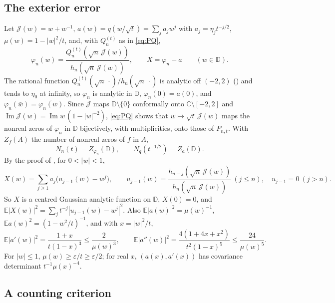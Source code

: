 \documentclass[11pt]{amsart}
\theoremstyle{definition}
\theoremstyle{remark}
\numberwithin{equation}{section}
\newcommand{\C}{\mathbb{C}}
\newcommand{\D}{\mathbb{D}}
\newcommand{\E}{\mathbb{E}}
\newcommand{\eps}{\varepsilon}
\DeclareMathOperator{\im}{Im}
\begin{document}
\subsection{The exterior error}\label{subsec:near1-X}
Let $\mathcal J(w)=w+w^{-1}$, $a(w)=q(w/\sqrt t)=\sum_ja_jw^j$ with $a_j=\eta_jt^{-j/2}$, $\mu(w)=1-|w|^2/t$, and, with $Q_n^{(t)}$ as in \eqref{eq:PQ},
\[
\varphi_n(w)=\frac{Q_n^{(t)}(\sqrt n\,\mathcal J(w))}{h_n(\sqrt n\,\mathcal J(w))},\qquad X=\varphi_n-a\qquad(w\in\D).
\]
The rational function $Q_n^{(t)}(\sqrt n\,\cdot)/h_n(\sqrt n\,\cdot)$ is analytic off $(-2,2)$ (\cite[Lemma~\ref{M-lem:resolvent}]{Main}) and tends to $\eta_0$ at infinity, so $\varphi_n$ is analytic in $\D$, $\varphi_n(0)=a(0)$, and $\varphi_n(\bar w)=\overline{\varphi_n(w)}$. Since $\mathcal J$ maps $\D\setminus\{0\}$ conformally onto $\C\setminus[-2,2]$ and $\im\mathcal J(w)=\im w\,(1-|w|^{-2})$, \eqref{eq:PQ} shows that $w\mapsto\sqrt t\,\mathcal J(w)$ maps the nonreal zeros of $\varphi_n$ in $\D$ bijectively, with multiplicities, onto those of $P_{n,t}$. With $Z_f(A)$ the number of nonreal zeros of $f$ in $A$,
\begin{equation}\label{eq:near1-counts}
N_n(t)=Z_{\varphi_n}(\D),\qquad N_q(t^{-1/2})=Z_a(\D).
\end{equation}
By the proof of \cite[Proposition~\ref{M-prop:exterior}]{Main}, for $0<|w|<1$,
\begin{equation}\label{eq:near1-X}
X(w)=\sum_{j\ge1}a_j\bigl(u_{j-1}(w)-w^j\bigr),\qquad u_{j-1}(w)=\frac{h_{n-j}(\sqrt n\,\mathcal J(w))}{h_n(\sqrt n\,\mathcal J(w))}\ (j\le n),\quad u_{j-1}=0\ (j>n).
\end{equation}
So $X$ is a centred Gaussian analytic function on $\D$, $X(0)=0$, and $\E|X(w)|^2=\sum_jt^{-j}|u_{j-1}(w)-w^j|^2$. Also $\E|a(w)|^2=\mu(w)^{-1}$, $\E a(w)^2=(1-w^2/t)^{-1}$, and with $x=|w|^2/t$,
\begin{equation}\label{eq:near1-a}
\E|a'(w)|^2=\frac{1+x}{t(1-x)^3}\le\frac2{\mu(w)^3},\qquad\E|a''(w)|^2=\frac{4(1+4x+x^2)}{t^2(1-x)^5}\le\frac{24}{\mu(w)^5}.
\end{equation}
For $|w|\le1$, $\mu(w)\ge\eps/t\ge\eps/2$; for real $x$, $(a(x),a'(x))$ has covariance determinant $t^{-1}\mu(x)^{-4}$.

\subsection{A counting criterion}
\end{document}
